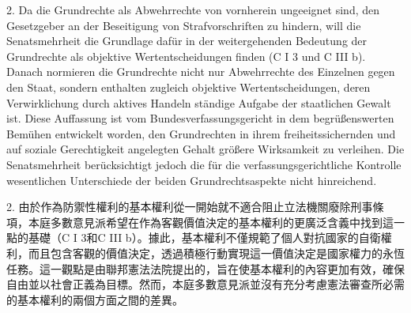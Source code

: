 \documentclass[12pt]{article}
\begin{document}
\syncleft
\begin{sourcepara}
2. Da die Grundrechte als Abwehrrechte von vornherein ungeeignet sind, den Gesetzgeber an der Beseitigung von Strafvorschriften zu hindern, will die Senatsmehrheit die Grundlage dafür in der weitergehenden Bedeutung der Grundrechte als objektive Wertentscheidungen finden (C I 3 und C III b). Danach normieren die Grundrechte nicht nur Abwehrrechte des Einzelnen gegen den Staat, sondern enthalten zugleich objektive Wertentscheidungen, deren Verwirklichung durch aktives Handeln ständige Aufgabe der staatlichen Gewalt ist. Diese Auffassung ist vom Bundesverfassungsgericht in dem begrüßenswerten Bemühen entwickelt worden, den Grundrechten in ihrem freiheitssichernden und auf soziale Gerechtigkeit angelegten Gehalt größere Wirksamkeit zu verleihen. Die Senatsmehrheit berücksichtigt jedoch die für die verfassungsgerichtliche Kontrolle wesentlichen Unterschiede der beiden Grundrechtsaspekte nicht hinreichend.
\end{sourcepara}
\begin{transpara}
2. 由於作為防禦性權利的基本權利從一開始就不適合阻止立法機關廢除刑事條項，本庭多數意見派希望在作為客觀價值決定的基本權利的更廣泛含義中找到這一點的基礎（C I 3和C III b）。據此，基本權利不僅規範了個人對抗國家的自衛權利，而且包含客觀的價值決定，透過積極行動實現這一價值決定是國家權力的永恆任務。這一觀點是由聯邦憲法法院提出的，旨在使基本權利的內容更加有效，確保自由並以社會正義為目標。然而，本庭多數意見派並沒有充分考慮憲法審查所必需的基本權利的兩個方面之間的差異。
\end{transpara}
\end{document}

